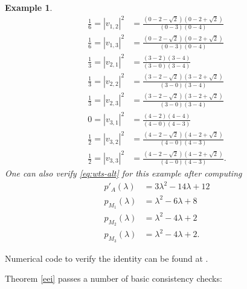 \documentclass{amsart}
\newtheorem{example}[lemma]{Example}
\begin{document}
\begin{example}
\begin{align*}
\frac{1}{6} = |v_{1,2}|^2 &= \frac{(0-2-\sqrt{2})(0-2+\sqrt{2})}{(0-3)(0-4)}\\
\frac{1}{6} = |v_{1,3}|^2 &= \frac{(0-2-\sqrt{2})(0-2+\sqrt{2})}{(0-3)(0-4)}\\[3mm]
%
\frac{1}{3} = |v_{2,1}|^2 &= \frac{(3-2)(3-4)}{(3-0)(3-4)} \\
\frac{1}{3} = |v_{2,2}|^2 &= \frac{(3-2-\sqrt{2})(3-2+\sqrt{2})}{(3-0)(3-4)} \\
\frac{1}{3} = |v_{2,3}|^2 &= \frac{(3-2-\sqrt{2})(3-2+\sqrt{2})}{(3-0)(3-4)} \\[3mm]
%
0 = |v_{3,1}|^2 &= \frac{(4-2)(4-4)}{(4-0)(4-3)} \\
\frac{1}{2} = |v_{3,2}|^2 &= \frac{(4-2-\sqrt{2})(4-2+\sqrt{2})}{(4-0)(4-3)}\\
\frac{1}{2} = |v_{3,3}|^2 &= \frac{(4-2-\sqrt{2})(4-2+\sqrt{2})}{(4-0)(4-3)}.
\end{align*}
One can also verify \eqref{eq:wts-alt} for this example after computing
\begin{align*}
p'_A(\lambda) &= 3\lambda^2-14\lambda+12 \\
p_{M_1}(\lambda) &= \lambda^2 - 6\lambda + 8 \\
p_{M_2}(\lambda) &= \lambda^2 - 4\lambda + 2 \\
p_{M_3}(\lambda) &= \lambda^2 - 4\lambda + 2.
\end{align*}
\end{example}

Numerical code to verify the identity can be found at \cite{EEIcode}.

Theorem \ref{eei} passes a number of basic consistency checks:
\end{document}
